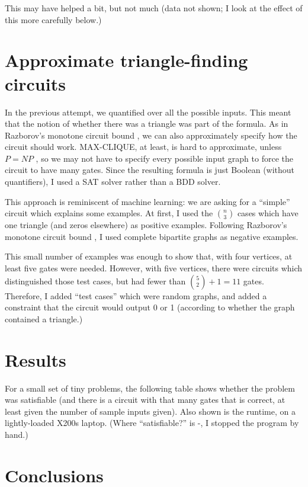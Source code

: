 \documentclass[12pt]{article}
\begin{document}
This may have helped a bit, but not much (data not shown; I
look at the effect of this more carefully below.)

\section{Approximate triangle-finding circuits}

In the previous attempt, we quantified over all the possible inputs. This meant that the notion of
whether there was a triangle was part of the formula. As in Razborov's monotone circuit bound \cite{Razborov85lowerbounds}, we
can also approximately specify how the circuit should work.
MAX-CLIQUE, at least, is
hard to approximate, unless $P=NP$ \cite{hastad_clique_1999}, so we may not have to
specify every possible input graph to force the circuit to have many gates.
Since the resulting formula
is just Boolean (without quantifiers), I used a SAT solver \cite{een_extensible_2003}
rather than a BDD solver.

This approach is reminiscent of machine learning: we are asking for a ``simple'' circuit
which explains some examples. At first,
I used the $n \choose 3$ cases which have one triangle (and zeros elsewhere) as
positive examples. Following Razborov's monotone circuit bound \cite{Razborov85lowerbounds}, 
I used complete bipartite graphs as negative examples.

This small number of examples was enough to show that, with four vertices,
at least five gates were needed. However, with five vertices, there were
circuits which distinguished those test cases, but had fewer than ${5 \choose 2} + 1 = 11$ gates.
Therefore, I added ``test cases'' which were random graphs,
and added a constraint that the circuit would output 0 or 1 (according
to whether the graph contained a triangle.)

\section{Results}

For a small set of tiny problems, the following table shows whether the problem was satisfiable
(and there is a circuit with that many gates that is correct, at least given the number of
sample inputs given). Also shown is the runtime, on a
lightly-loaded X200s laptop. (Where ``satisfiable?'' is -, I stopped the program by hand.)


\section{Conclusions}
\end{document}

